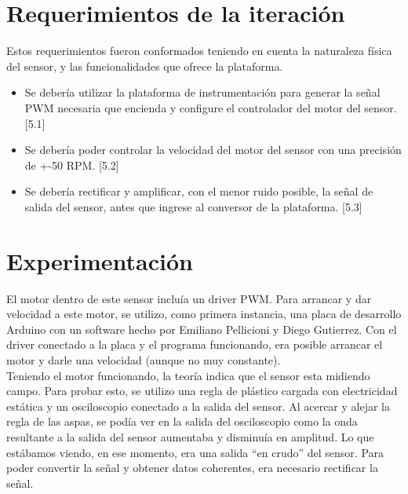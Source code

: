 

\section{Requerimientos de la iteración} %
\label{it6:sec:requerimientos_de_la_iteracion}

Estos requerimientos fueron conformados teniendo en cuenta la naturaleza física del sensor, y las funcionalidades que ofrece la plataforma. 

\begin{itemize}
\item Se debería utilizar la plataforma de instrumentación para generar la señal PWM necesaria que encienda y configure el controlador del motor del sensor. [5.1]
\item Se debería poder controlar la velocidad del motor del sensor con una precisión de +-50 RPM. [5.2]
\item Se debería rectificar y amplificar, con el menor ruido posible, la señal de salida del sensor, antes que ingrese al conversor de la plataforma. [5.3]
\end{itemize}



\section{Experimentación} %
\label{it6:sec:experimentacion}

El motor dentro de este sensor incluía un driver PWM. Para arrancar y dar velocidad a este motor, se utilizo, como primera instancia, una placa de desarrollo Arduino con un software hecho por Emiliano Pellicioni y Diego Gutierrez. Con el driver conectado a la placa y el programa funcionando, era posible arrancar el motor y darle una velocidad (aunque no muy constante). \\

Teniendo el motor funcionando, la teoría indica que el sensor esta midiendo campo. Para probar esto, se utilizo una regla de plástico cargada con electricidad estática y un osciloscopio conectado a la salida del sensor. Al acercar y alejar la regla de las aspas, se podía ver en la salida del osciloscopio como la onda resultante a la salida del sensor aumentaba y disminuía en amplitud. Lo que estábamos viendo, en ese momento, era una salida ``en crudo'' del sensor. Para poder convertir la señal y obtener datos coherentes, era necesario rectificar la señal. \\

